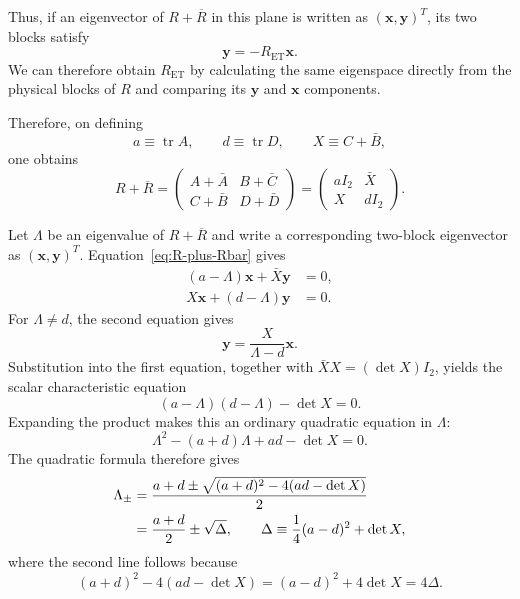 \documentclass[11pt,a4paper]{article}
\newcommand{\Tr}{\operatorname{tr}}
\newcommand{\mat}[1]{\bm{#1}}
\begin{document}
Thus, if an eigenvector of $R+\overline R$ in this plane is written as
$(\mat x,\mat y)^T$, its two blocks satisfy
\begin{equation}
 \mat y=-R_{\mathrm{ET}}\mat x.
 \label{eq:ret-as-modal-plane-slope}
\end{equation}
We can therefore obtain $R_{\mathrm{ET}}$ by calculating the same eigenspace
directly from the physical blocks of $R$ and comparing its $\mat y$ and
$\mat x$ components.

Therefore, on defining
\begin{equation}
 a\equiv\Tr A,
 \qquad d\equiv\Tr D,
 \qquad X\equiv C+\bar B,
 \label{eq:et-a-d-X}
\end{equation}
one obtains
\begin{equation}
 R+\overline R
 =\begin{pmatrix}
   A+\bar A&B+\bar C\\
   C+\bar B&D+\bar D
  \end{pmatrix}
 =\begin{pmatrix}
   aI_2&\bar X\\X&dI_2
  \end{pmatrix}.
 \label{eq:R-plus-Rbar}
\end{equation}

Let $\Lambda$ be an eigenvalue of $R+\overline R$ and write a corresponding
two-block eigenvector as $(\mat x,\mat y)^T$.  Equation~\eqref{eq:R-plus-Rbar}
gives
\begin{align}
 (a-\Lambda)\mat x+\bar X\mat y&=0,
 \label{eq:et-eigenvector-upper}\\
 X\mat x+(d-\Lambda)\mat y&=0.
 \label{eq:et-eigenvector-lower}
\end{align}
For $\Lambda\ne d$, the second equation gives
\begin{equation}
 \mat y=\frac{X}{\Lambda-d}\mat x.
 \label{eq:y-from-x-et}
\end{equation}
Substitution into the first equation, together with
$\bar X X=(\det X)I_2$, yields the scalar characteristic equation
\begin{equation}
 (a-\Lambda)(d-\Lambda)-\det X=0.
 \label{eq:et-lambda-characteristic}
\end{equation}
Expanding the product makes this an ordinary quadratic equation in
$\Lambda$:
\begin{equation}
 \Lambda^2-(a+d)\Lambda+ad-\det X=0.
 \label{eq:et-lambda-quadratic}
\end{equation}
The quadratic formula therefore gives
\begin{align}
 \Lambda_{\pm}
 &=\frac{a+d\mathbin{\pm}
  \sqrt{(a+d)^2-4(ad-\det X)}}{2} \notag\\
 &=\frac{a+d}{2}\mathbin{\pm}\sqrt{\Delta},
 \qquad
 \Delta\equiv\frac14(a-d)^2+\det X,
 \label{eq:et-delta}
\end{align}
where the second line follows because
\begin{equation}
 (a+d)^2-4(ad-\det X)
 =(a-d)^2+4\det X
 =4\Delta.
 \label{eq:et-discriminant}
\end{equation}
\end{document}
